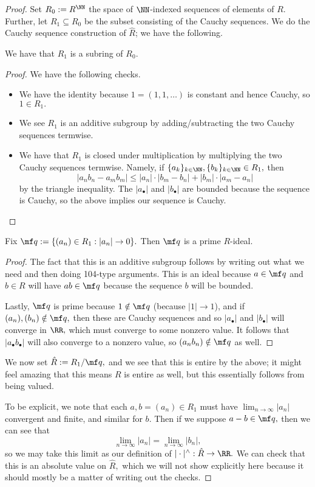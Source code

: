 \documentclass[../notes.tex]{subfiles}
\begin{document}
\begin{proof}
	Set $R_0:=R^\NN$ the space of $\NN$-indexed sequences of elements of $R.$ Further, let $R_1\subseteq R_0$ be the subset consisting of the Cauchy sequences. We do the Cauchy sequence construction of $\hat R$; we have the following.
	\begin{lemma}
		We have that $R_1$ is a subring of $R_0.$
	\end{lemma}
	\begin{proof}
		We have the following checks.
		\begin{itemize}
			\item We have the identity because $1=(1,1,\ldots)$ is constant and hence Cauchy, so $1\in R_1.$
			\item We see $R_1$ is an additive subgroup by adding/subtracting the two Cauchy sequences termwise.
			\item We have that $R_1$ is closed under multiplication by multiplying the two Cauchy sequences termwise. Namely, if $\{a_k\}_{k\in\NN},\{b_k\}_{k\in\NN}\in R_1,$ then
			\[|a_nb_n-a_mb_m|\le|a_n|\cdot|b_m-b_n|+|b_m|\cdot|a_m-a_n|\]
			by the triangle inequality. The $|a_\bullet|$ and $|b_\bullet|$ are bounded because the sequence is Cauchy, so the above implies our sequence is Cauchy.
			\qedhere
		\end{itemize}
	\end{proof}
	\begin{lemma}
		Fix $\mf q:=\{(a_n)\in R_1:|a_n|\to0\}.$ Then $\mf q$ is a prime $R$-ideal.
	\end{lemma}
	\begin{proof}
		The fact that this is an additive subgroup follows by writing out what we need and then doing 104-type arguments. This is an ideal because $a\in\mf q$ and $b\in R$ will have $ab\in\mf q$ because the sequence $b$ will be bounded.
		
		Lastly, $\mf q$ is prime because $1\notin\mf q$ (because $|1|\to1$), and if $(a_n),(b_n)\notin\mf q,$ then these are Cauchy sequences and so $|a_\bullet|$ and $|b_\bullet|$ will converge in $\RR,$ which must converge to some nonzero value. It follows that $|a_\bullet b_\bullet|$ will also converge to a nonzero value, so $(a_nb_n)\notin\mf q$ as well.
	\end{proof}
	We now set $\hat R:=R_1/\mf q,$ and we see that this is entire by the above; it might feel amazing that this means $R$ is entire as well, but this essentially follows from being valued.

	To be explicit, we note that each $a,b=(a_n)\in R_1$ must have $\lim_{n\to\infty}|a_n|$ convergent and finite, and similar for $b.$ Then if we suppose $a-b\in\mf q,$ then we can see that
	\[\lim_{n\to\infty}|a_n|=\lim_{n\to\infty}|b_n|,\]
	so we may take this limit as our definition of $|\cdot|^\wedge:\hat R\to\RR.$ We can check that this is an absolute value on $\hat R,$ which we will not show explicitly here because it should mostly be a matter of writing out the checks.


\end{proof}
\end{document}
